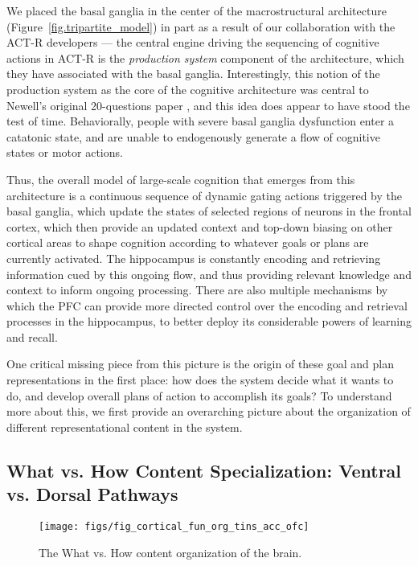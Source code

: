\documentclass[11pt,twoside]{article}
\begin{document}
We placed the basal ganglia in the center of the macrostructural architecture (Figure~\ref{fig.tripartite_model}) in part as a result of our collaboration with the ACT-R developers --- the central engine driving the sequencing of cognitive actions in ACT-R is the {\em production system} component of the architecture, which they have associated with the basal ganglia.  Interestingly, this notion of the production system as the core of the cognitive architecture was central to Newell's original 20-questions paper \cite{Newell73}, and this idea does appear to have stood the test of time.  Behaviorally, people with severe basal ganglia dysfunction enter a catatonic state, and are unable to endogenously generate a flow of cognitive states or motor actions.

Thus, the overall model of large-scale cognition that emerges from this architecture is a continuous sequence of dynamic gating actions triggered by the basal ganglia, which update the states of selected regions of neurons in the frontal cortex, which then provide an updated context and top-down biasing on other cortical areas to shape cognition according to whatever goals or plans are currently activated.  The hippocampus is constantly encoding and retrieving information cued by this ongoing flow, and thus providing relevant knowledge and context to inform ongoing processing.  There are also multiple mechanisms by which the PFC can provide more directed control over the encoding and retrieval processes in the hippocampus, to better deploy its considerable powers of learning and recall.

One critical missing piece from this picture is the origin of these goal and plan representations in the first place: how does the system decide what it wants to do, and develop overall plans of action to accomplish its goals?  To understand more about this, we first provide an overarching picture about the organization of different representational content in the system.

\subsection{What vs. How Content Specialization: Ventral vs. Dorsal Pathways}

\begin{figure}
  \centering\texttt{[image: figs/fig\_cortical\_fun\_org\_tins\_acc\_ofc]}
  \caption{\small The What vs. How content organization of the brain.}
  \label{fig.what_how}
\end{figure}
\end{document}
